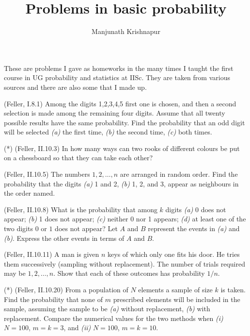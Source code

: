 \documentclass[preprint,  11pt]{amsart}
\begin{document}
\title{Problems in basic probability}
\author{Manjunath Krishnapur}



\maketitle

  These are  problems I gave as homeworks in the many times I taught the first course in UG probability and statistics at IISc. They are taken from various sources and there are also some that I made up.
%
%



\medskip
\bepr (Feller, I.8.1) Among the digits 1,2,3,4,5 first one is chosen, and then a second selection is made among the remaining four digits. Assume that all twenty possible results have the same probability. Find the probability that an odd digit will be selected {\em (a)} the first time, {\em (b)} the second time, {\em (c)} both times.
\eepr

\medskip
\bepr (*) (Feller, II.10.3) In how many ways can two rooks of different colours be put on a chessboard so that they can take each other?
\eepr

\medskip
\bepr (Feller, II.10.5) The numbers $1,2,\ldots ,n$ are arranged in random order. Find the probability that the digits {\em (a)} 1 and 2,  {\em (b)} 1, 2, and 3,  \; appear as neighbours in the order named.
\eepr

\medskip
\bepr (Feller, II.10.8) What is the probability that among $k$ digits  {\em (a)} 0 does not appear;  {\em (b)} 1 does not appear; {\em (c)} neither 0 nor 1 appears; {\em (d)} at least one of the two digits $0$ or $1$ does not appear? Let $A$ and $B$ represent the events in {\em (a)} and {\em (b)}. Express the other events in terms of $A$ and $B$.
\eepr

\medskip
\bepr (Feller, II.10.11) A man is given $n$ keys of which only one fits his door. He tries them successively (sampling without replacement). The number of trials required may be $1,2,\ldots ,n$. Show that each of these outcomes has probability $1/n$.
\eepr

\medskip
\bepr (*) (Feller, II.10.20) From a population of $N$ elements a sample of size $k$ is taken. Find the probability that none of $m$ prescribed elements will be included in the sample, assuming the sample to be {\em (a)} without replacement, \; {\em (b)} with replacement. Compare the numerical values for the two methods when {\em (i)} $N=100$, $m=k=3$, and {\em (ii)} $N=100$, $m=k=10$.
\eepr
\end{document}
